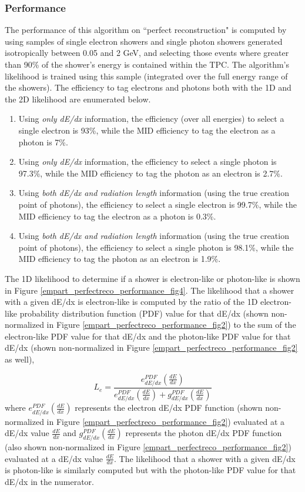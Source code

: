 \subsubsection{Performance}\label{empart_perfectreco_performance}
The performance of this algorithm on ``perfect reconstruction" is computed by using samples of single electron showers and single photon showers generated isotropically between 0.05 and 2 GeV, and selecting those events where greater than 90\% of the shower's energy is contained within the TPC. The algorithm's likelihood is trained using this sample (integrated over the full energy range of the showers). The efficiency to tag electrons and photons both with the 1D and the 2D likelihood are enumerated below.
\begin{enumerate}
\item Using \textit{only dE/dx} information, the efficiency (over all energies) to select a single electron is 93\%, while the MID efficiency to tag the electron as a photon is 7\%. 
\item Using \textit{only dE/dx} information, the efficiency to select a single photon is 97.3\%, while the MID efficiency to tag the photon as an electron is 2.7\%.
\item Using \textit{both dE/dx and radiation length} information (using the true creation point of photons), the efficiency to select a single electron is 99.7\%, while the MID efficiency to tag the electron as a photon is 0.3\%. 
\item Using \textit{both dE/dx and radiation length} information (using the true creation point of photons), the efficiency to select a single photon is 98.1\%, while the MID efficiency to tag the photon as an electron is 1.9\%.
\end{enumerate}


The 1D likelihood to determine if a shower is electron-like or photon-like is shown in Figure \ref{empart_perfectreco_performance_fig4}. The likelihood that a shower with a given dE/dx is electron-like is computed by the ratio of the 1D electron-like probability distribution function (PDF) value for that dE/dx (shown non-normalized in Figure \ref{empart_perfectreco_performance_fig2}) to the sum of the electron-like PDF value for that dE/dx and the photon-like PDF value for that dE/dx (shown non-normalized in Figure \ref{empart_perfectreco_performance_fig2} as well),

\begin{equation}\label{1D_dedx_likelihood_eqtn}
L_e=\frac{e_{dE/dx}^{PDF}(\frac{dE}{dx})}{ e_{dE/dx}^{PDF}(\frac{dE}{dx}) + g_{dE/dx}^{PDF}(\frac{dE}{dx}) }
\end{equation}
where $e_{dE/dx}^{PDF}(\frac{dE}{dx})$ represents the electron dE/dx PDF function (shown non-normalized in Figure \ref{empart_perfectreco_performance_fig2}) evaluated at a dE/dx value $\frac{dE}{dx}$ and $g_{dE/dx}^{PDF}(\frac{dE}{dx})$ represents the photon dE/dx PDF function (also shown non-normalized in Figure \ref{empart_perfectreco_performance_fig2}) evaluated at a dE/dx value $\frac{dE}{dx}$. The likelihood that a shower with a given dE/dx is photon-like is similarly computed but with the photon-like PDF value for that dE/dx in the numerator.\\

